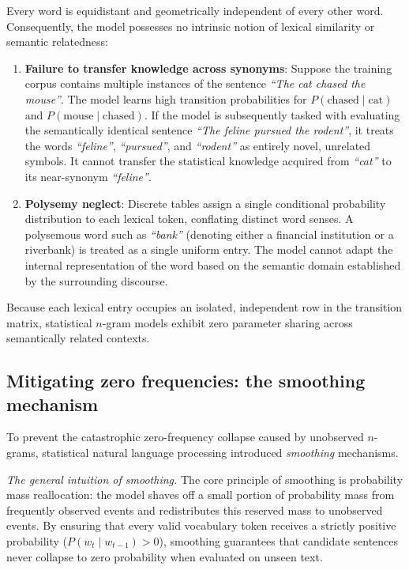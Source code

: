 \documentclass[../../../main.tex]{subfiles}
\begin{document}
Every word is equidistant and geometrically independent of every other word. Consequently, the model possesses no intrinsic notion of lexical similarity or semantic relatedness:
\begin{enumerate}
    \item \textbf{Failure to transfer knowledge across synonyms}: Suppose the training corpus contains multiple instances of the sentence \textit{``The cat chased the mouse''}. The model learns high transition probabilities for $P(\text{chased} \mid \text{cat})$ and $P(\text{mouse} \mid \text{chased})$. If the model is subsequently tasked with evaluating the semantically identical sentence \textit{``The feline pursued the rodent''}, it treats the words \textit{``feline''}, \textit{``pursued''}, and \textit{``rodent''} as entirely novel, unrelated symbols. It cannot transfer the statistical knowledge acquired from \textit{``cat''} to its near-synonym \textit{``feline''}.
    \item \textbf{Polysemy neglect}: Discrete tables assign a single conditional probability distribution to each lexical token, conflating distinct word senses. A polysemous word such as \textit{``bank''} (denoting either a financial institution or a riverbank) is treated as a single uniform entry. The model cannot adapt the internal representation of the word based on the semantic domain established by the surrounding discourse.
\end{enumerate}

Because each lexical entry occupies an isolated, independent row in the transition matrix, statistical $n$-gram models exhibit zero parameter sharing across semantically related contexts.

\subsection{Mitigating zero frequencies: the smoothing mechanism}
\label{subsec:smoothing_mitigation}

To prevent the catastrophic zero-frequency collapse caused by unobserved $n$-grams, statistical natural language processing introduced \textit{smoothing} mechanisms. 

\textit{The general intuition of smoothing.} The core principle of smoothing is probability mass reallocation: the model shaves off a small portion of probability mass from frequently observed events and redistributes this reserved mass to unobserved events. By ensuring that every valid vocabulary token receives a strictly positive probability ($P(w_t \mid w_{t-1}) > 0$), smoothing guarantees that candidate sentences never collapse to zero probability when evaluated on unseen text.
\end{document}
